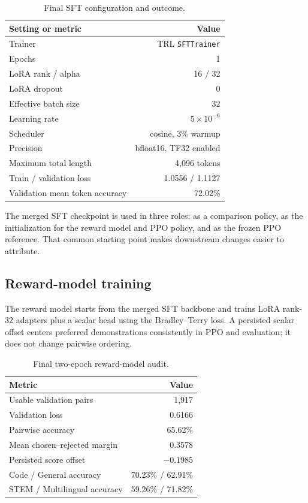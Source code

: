 \documentclass[11pt]{article}
\newcommand{\trl}{\textsc{TRL}}
\begin{document}
\begin{table}[H]
\centering
\caption{Final SFT configuration and outcome.}
\label{tab:sft}
\begin{tabularx}{0.88\textwidth}{@{}Y r@{}}
\toprule
\textbf{Setting or metric} & \textbf{Value}\\
\midrule
Trainer & \trl{} \texttt{SFTTrainer}\\
Epochs & 1\\
LoRA rank / alpha & 16 / 32\\
LoRA dropout & 0\\
Effective batch size & 32\\
Learning rate & $5\times10^{-6}$\\
Scheduler & cosine, 3\% warmup\\
Precision & bfloat16, TF32 enabled\\
Maximum total length & 4,096 tokens\\
Train / validation loss & 1.0556 / 1.1127\\
Validation mean token accuracy & 72.02\%\\
\bottomrule
\end{tabularx}
\end{table}

The merged SFT checkpoint is used in three roles: as a comparison policy, as
the initialization for the reward model and PPO policy, and as the frozen PPO
reference. That common starting point makes downstream changes easier to
attribute.

\subsection{Reward-model training}

The reward model starts from the merged SFT backbone and trains LoRA rank-32
adapters plus a scalar head using the Bradley--Terry loss. A persisted scalar
offset centers preferred demonstrations consistently in PPO and evaluation;
it does not change pairwise ordering.

\begin{table}[H]
\centering
\caption{Final two-epoch reward-model audit.}
\label{tab:rm}
\begin{tabularx}{0.88\textwidth}{@{}Y r@{}}
\toprule
\textbf{Metric} & \textbf{Value}\\
\midrule
Usable validation pairs & 1,917\\
Validation loss & 0.6166\\
Pairwise accuracy & 65.62\%\\
Mean chosen--rejected margin & 0.3578\\
Persisted score offset & $-0.1985$\\
Code / General accuracy & 70.23\% / 62.91\%\\
STEM / Multilingual accuracy & 59.26\% / 71.82\%\\
\bottomrule
\end{tabularx}
\end{table}
\end{document}
